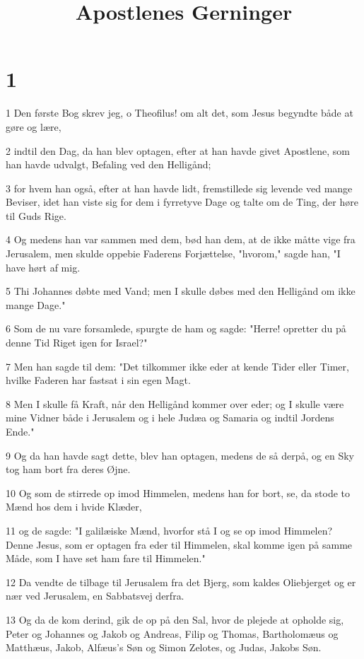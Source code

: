 

\title{Apostlenes Gerninger}


\chapter{1}

\par 1 Den første Bog skrev jeg, o Theofilus! om alt det, som Jesus begyndte både at gøre og lære,
\par 2 indtil den Dag, da han blev optagen, efter at han havde givet Apostlene, som han havde udvalgt, Befaling ved den Helligånd;
\par 3 for hvem han også, efter at han havde lidt, fremstillede sig levende ved mange Beviser, idet han viste sig for dem i fyrretyve Dage og talte om de Ting, der høre til Guds Rige.
\par 4 Og medens han var sammen med dem, bød han dem, at de ikke måtte vige fra Jerusalem, men skulde oppebie Faderens Forjættelse, "hvorom," sagde han, "I have hørt af mig.
\par 5 Thi Johannes døbte med Vand; men I skulle døbes med den Helligånd om ikke mange Dage."
\par 6 Som de nu vare forsamlede, spurgte de ham og sagde: "Herre! opretter du på denne Tid Riget igen for Israel?"
\par 7 Men han sagde til dem: "Det tilkommer ikke eder at kende Tider eller Timer, hvilke Faderen har fastsat i sin egen Magt.
\par 8 Men I skulle få Kraft, når den Helligånd kommer over eder; og I skulle være mine Vidner både i Jerusalem og i hele Judæa og Samaria og indtil Jordens Ende."
\par 9 Og da han havde sagt dette, blev han optagen, medens de så derpå, og en Sky tog ham bort fra deres Øjne.
\par 10 Og som de stirrede op imod Himmelen, medens han for bort, se, da stode to Mænd hos dem i hvide Klæder,
\par 11 og de sagde: "I galilæiske Mænd, hvorfor stå I og se op imod Himmelen? Denne Jesus, som er optagen fra eder til Himmelen, skal komme igen på samme Måde, som I have set ham fare til Himmelen."
\par 12 Da vendte de tilbage til Jerusalem fra det Bjerg, som kaldes Oliebjerget og er nær ved Jerusalem, en Sabbatsvej derfra.
\par 13 Og da de kom derind, gik de op på den Sal, hvor de plejede at opholde sig, Peter og Johannes og Jakob og Andreas, Filip og Thomas, Bartholomæus og Matthæus, Jakob, Alfæus's Søn og Simon Zelotes, og Judas, Jakobs Søn.
